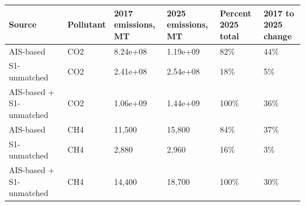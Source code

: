 \documentclass[lineno,pdflatex,sn-nature]{sn-jnl}
\providecommand{\DIFaddbeginFL}{} %
\providecommand{\DIFdelendFL}{} %
\providecommand{\DIFaddincludegraphics}[2][]{{\color{blue}\fbox{\DIFOincludegraphics[#1]{#2}}}} %
\DeclareRobustCommand{\DIFaddbeginFL}{\DIFOaddbeginFL \let\includegraphics\DIFaddincludegraphics} %
\DeclareRobustCommand{\DIFdelendFL}{\DIFOaddendFL \let\includegraphics\DIFOincludegraphics} %
\begin{document}
\begin{table}[!h]
\DIFdelendFL \DIFaddbeginFL \setlength{\tabcolsep}{3pt}
\begin{tabular}[t]{l|l|l|l|l|l}
\hline
Source & Pollutant & \shortstack{2017\\emissions, MT} & \shortstack{2025\\emissions, MT} & \shortstack{Percent 2025\\total} & \shortstack{2017 to 2025\\change}\\
\hline
AIS-based & CO2 & 8.24e+08 & 1.19e+09 & 82\% & 44\%\\
\hline
S1-unmatched & CO2 & 2.41e+08 & 2.54e+08 & 18\% & 5\%\\
\hline
AIS-based + S1-unmatched & CO2 & 1.06e+09 & 1.44e+09 & 100\% & 36\%\\
\hline
AIS-based & CH4 & 11,500 & 15,800 & 84\% & 37\%\\
\hline
S1-unmatched & CH4 & 2,880 & 2,960 & 16\% & 3\%\\
\hline
AIS-based + S1-unmatched & CH4 & 14,400 & 18,700 & 100\% & 30\%\\
\hline

\end{tabular}
\end{table}
\end{document}
